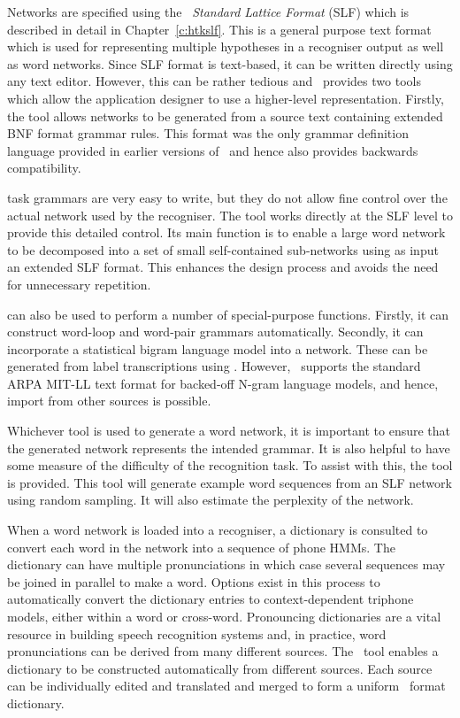 Networks are specified using the \HTK\ \textit{Standard Lattice Format} (SLF)
which is described in detail in Chapter~\ref{c:htkslf}.
This is a general purpose text format which is used for representing
multiple hypotheses in a recogniser output as well as word networks.  
Since SLF format is text-based, it can be written directly using any text editor.
However, this can be rather tedious and \HTK\ provides
two tools which allow the application designer to use a higher-level
representation.  Firstly, the tool  allows networks
to be generated from a source text containing extended BNF format
grammar rules.  This format was the only grammar definition
language provided in earlier versions of \HTK\ and hence 
 also provides backwards compatibility. 

 task grammars are very easy to write, but they 
do not allow fine control
over the actual network used by the recogniser. 
The tool  works directly at the SLF level to provide
this detailed control.  Its main function is to 
enable a large word network to be decomposed into
a set of small self-contained sub-networks using as input an extended
SLF format.  This enhances the
design process and avoids the need for unnecessary repetition.

 can also be used to perform a number
of special-purpose functions.  Firstly, it can construct 
word-loop and word-pair grammars automatically.  Secondly,
it can incorporate a statistical bigram
language model into a network.  These can be generated from label
transcriptions using .  However,
\HTK\ supports the standard ARPA MIT-LL text format for backed-off
N-gram language models, and hence, import from other sources is possible.
 
Whichever tool is used to generate a word network, it is important
to ensure that the generated network represents the intended grammar.
It is also helpful to have some measure of the difficulty of the
recognition task.  To assist with this, the tool  is
provided.  This tool will generate example word sequences from
an SLF network using random sampling.  It will also estimate the
perplexity of the network.

When a word network is loaded into a recogniser, 
a dictionary is consulted to convert each
word in the network into a sequence of phone HMMs.   The dictionary can
have multiple pronunciations in which case several sequences may be joined
in parallel to make a word.  Options exist in this process to automatically
convert the dictionary entries to context-dependent triphone
models, either within a word or cross-word.  Pronouncing 
dictionaries are a vital resource in building speech recognition
systems and, in practice, word pronunciations can be derived from
many different sources.  The \HTK\ tool  enables a dictionary
to be constructed automatically from different sources.  Each source
can be individually edited and translated and merged to form a
uniform \HTK\ format dictionary.

